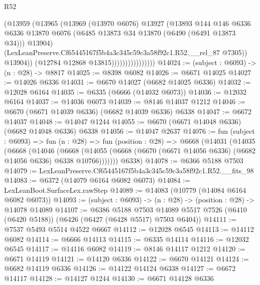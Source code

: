 \begin{lexlean}{R52}
\begin{coremodule}
                                  (@13959
                                    (@13965
                                      (@13969
                                        (@13970 @6076)
                                        @13927
                                        (@13893
                                          @144
                                          @146
                                          @6336
                                          @6336
                                          @13870
                                          @6076
                                          (@6485 @13873 @34 @13870 (@6490 (@6491 @13873 @34)))
                                          @13904)
                                        (LexLeanPreserve.Cf65445167f5b4a3c345c59c3a58f92c1.R52.__rel_87
                                          @7305))
                                      @13904))
                                  (@12784 @12868 @13815))))))))))))))))
@14024 := (subject : @6093) -> (n : @28) -> @8817
@14025 := @8398 @6082
@14026 := @6671 @14025
@14027 := @14026 @6336
@14031 := @6670 @14027 (@6682 @14025 @6336)
@14032 := @12028 @6164
@14035 := @6335 (@6666 (@14032 @6073))
@14036 := @12032 @6164
@14037 := @14036 @6073
@14039 := @8146 @14037 @1212
@14046 := @6670 (@6671 @14039 @6336) (@6682 @14039 @6336) @6338
@14047 := @6672 @14037
@14048 := @14047 @1244
@14055 := @6670 (@6671 @14048 @6336) (@6682 @14048 @6336) @6338
@14056 := @14047 @2637
@14076 := fun (subject : @6093) =>
  fun (n : @28) =>
  fun (position : @28) =>
  @6668
    (@14031
      (@14035
        (@6668
          (@14046
            (@6668
              (@14055 (@6668 (@6670 (@6671 @14056 @6336) (@6682 @14056 @6336) @6338 @10766)))))))
      @6338)
@14078 := @6366 @5188 @7503
@14079 := LexLeanPreserve.Cf65445167f5b4a3c345c59c3a58f92c1.R52.__fits_98
@14083 := @6372 (@14079 @6164 @6082 @6073)
@14084 := LexLeanBoot.SurfaceLex.rawStep
@14089 := @14083 (@10779 (@14084 @6164 @6082 @6073))
@14093 := (subject : @6093) -> (n : @28) -> (position : @28) -> @14078 @14089
@14107 := @6386
    @5188
    @7503
    @14089
    @5517
    @7526
    (@6410 (@6420 @5188))
    (@6426 (@6427 (@6428 @5517) @7503 @6404))
@14111 := @7537 @5493 @5514 @4522 @6667
@14112 := @12028 @6545
@14113 := @14112 @6082
@14114 := @6666 @14113
@14115 := @6335 @14114
@14116 := @12032 @6545
@14117 := @14116 @6082
@14119 := @8146 @14117 @1212
@14120 := @6671 @14119
@14121 := @14120 @6336
@14122 := @6670 @14121
@14124 := @6682 @14119 @6336
@14126 := @14122 @14124 @6338
@14127 := @6672 @14117
@14128 := @14127 @1244
@14130 := @6671 @14128 @6336

\end{coremodule}
\end{lexlean}
